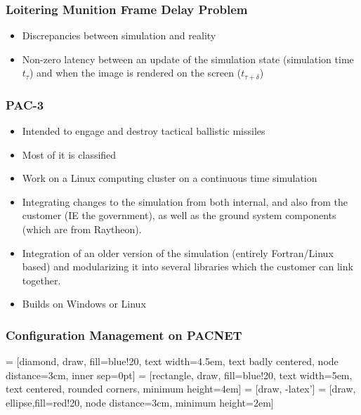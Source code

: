 \documentclass[aspectratio=169]{beamer}
\begin{document}
\begin{frame}
  \frametitle{Loitering Munition Frame Delay Problem}
  \begin{itemize}
  \item Discrepancies between simulation and reality
  \item Non-zero latency between an update of the simulation state (simulation time $t_{\tau}$) and when the image is rendered on the screen ($t_{\tau+\delta}$)
  \end{itemize}
\end{frame}

\begin{frame}
  \frametitle{PAC-3} %
  \begin{itemize}
  \item Intended to engage and destroy tactical ballistic missiles
  \item Most of it is classified
  \item Work on a Linux computing cluster on a continuous time simulation
  \item Integrating changes to the simulation from both internal, and also from the customer (IE the government), as well as the ground system components (which are from Raytheon).
  \item Integration of an older version of the simulation (entirely Fortran/Linux based) and modularizing it into several libraries which the customer can link together.  
  \item Builds on Windows or Linux
  \end{itemize}
\end{frame}


\begin{frame}
  \frametitle{Configuration Management on PACNET}

\end{frame}

 = [diamond, draw, fill=blue!20, 
    text width=4.5em, text badly centered, node distance=3cm, inner sep=0pt]
 = [rectangle, draw, fill=blue!20, 
    text width=5em, text centered, rounded corners, minimum height=4em]
 = [draw, -latex']
 = [draw, ellipse,fill=red!20, node distance=3cm,
  minimum height=2em]
\end{document}
